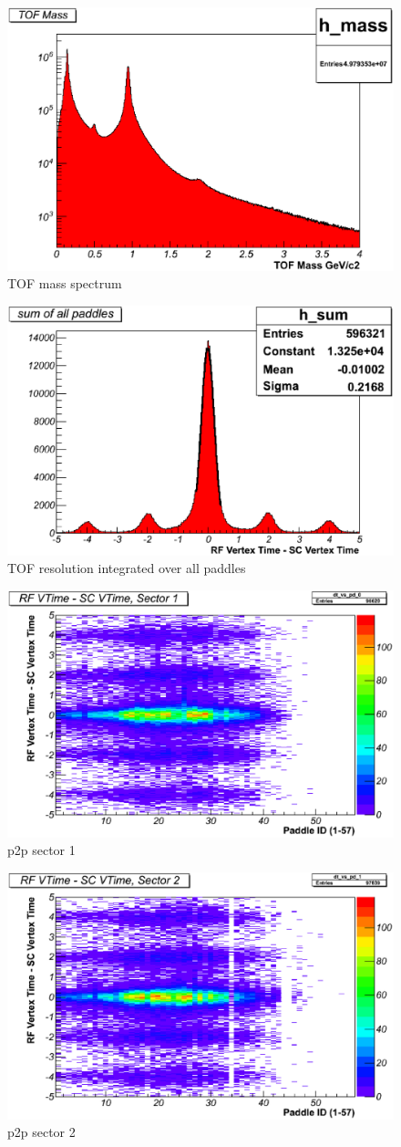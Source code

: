 \begin{figure}\begin{center}
	\includegraphics[width=.40\linewidth]{figures/calib/tof/Tof_56855_final_mass.eps}
	\caption{TOF mass spectrum}
	\label{plt:tofmass}
\end{center}\end{figure}

\begin{figure}\begin{center}
	\includegraphics[width=.40\linewidth]{figures/calib/tof/Tof_56855_final_resolution.eps}
	\caption{TOF resolution integrated over all paddles}
	\label{plt:tofres}
\end{center}\end{figure}

\begin{figure}\begin{center}
	\includegraphics[width=.40\linewidth]{figures/calib/tof/Tof_56855_final_s1p2p.eps}
	\caption{p2p sector 1}
	\label{plt:tofsec1}
\end{center}\end{figure}

\begin{figure}\begin{center}
	\includegraphics[width=.40\linewidth]{figures/calib/tof/Tof_56855_final_s2p2p.eps}
	\caption{p2p sector 2}
	\label{plt:tofsec2}
\end{center}\end{figure}

